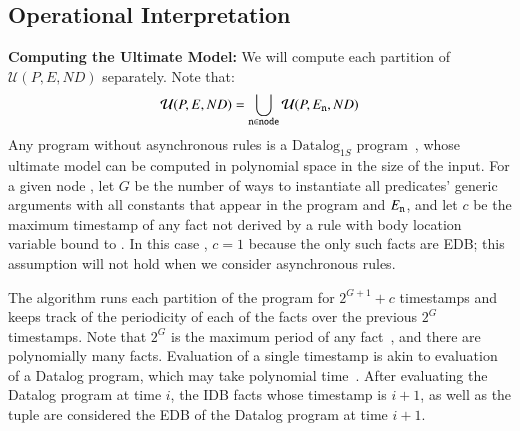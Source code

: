 
\subsection{Operational Interpretation}
\vspace{1em}
{\bf Computing the Ultimate Model:}
We will compute each partition of $\mathcal{U}(P, E, ND)$ separately.  Note that:
$$\mathcal{U}(P, E, ND) = \bigcup_{\text{\dedalus{{\scriptsize n}}} \in \text{\dedalus{{\scriptsize node}}}} \mathcal{U}(P, E_{\text{\dedalus{{\scriptsize n}}}}, ND)$$
Any \lang program without asynchronous rules is a $\text{Datalog}_{1S}$ program~\cite{tdd}, whose ultimate model can be computed in polynomial space in the size of the input.  
For a given node , let $G$ be the number of ways to instantiate all predicates' generic arguments with all constants that appear in the program and $E_{\text{\dedalus{{\scriptsize n}}}}$, and let $c$ be the maximum timestamp of any fact not derived by a rule with body location variable bound to .  In this case , $c = 1$ because the only such facts are EDB; this assumption will not hold when we consider asynchronous rules.

The algorithm  runs each partition of the program for $2^{G+1} + c$ timestamps and keeps track of the periodicity of each of the facts over the previous $2^G$ timestamps.  Note that $2^G$ is the maximum period of any fact~\cite{tdd}, and there are polynomially many facts.  Evaluation of a single timestamp is akin to evaluation of a Datalog program, which may take polynomial time~\cite{immerman-ptime, vardi-ptime}.  After evaluating the Datalog program at time $i$, the IDB facts whose timestamp is $i+1$, as well as the tuple  are considered the EDB of the Datalog program at time $i+1$.

